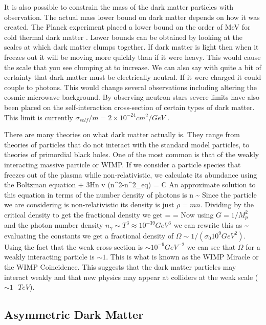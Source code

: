 It is also possible to constrain the mass of the dark matter particles with observation. The actual mass lower bound on dark matter depends on how it was created. 
The Planck experiment placed a lower bound on the order of MeV for cold thermal dark matter \cite{planck}. Lower bounds can be obtained by looking at the scales at
which dark matter clumps together. If dark matter is light then when it freezes out it will be moving more quickly than if it were heavy. This would cause the scale
that you see clumping at to increase. We can also say with quite a bit of certainty that dark matter must be electrically neutral. If it were charged it could couple
 to photons. This would change several observations including altering the cosmic microwave background. By observing neutron stars severe limits have also been placed 
on the self-interaction cross-section of certain types of dark matter. This limit is currently $\sigma_{self} /m = 2 \times 10^{-24} cm^2/GeV$ \cite{selfint}.

There are many theories on what dark matter actually is. They range from theories of particles that do not interact with the standard model particles, to  
 theories of primordial black holes. One of the most common is that of the weakly interacting massive particle or WIMP. If we consider a particle species that 
freezes out of the plasma while non-relativistic, we calculate its abundance using the Boltzman equation
\beq
    + 3Hn \langle \sigma v \rangle (n^2-n^2_{eq}) = C
\eeq
An approximate solution to this equation in terms of the number density of photons is
\beq
    n \sim {}
\eeq
Since the particle we are considering is non-relativistic its density is just $\rho = m n$. Dividing by the critical density to get the fractional density we get
\beq
    \Omega =  = 
\eeq
Now using $G=1/ M_p^2$ and the photon number density $ n_\gamma \sim T^3 \approx 10^{-39} GeV^3$ we can rewrite this as
\beq
   \Omega \sim {} 
\eeq
evaluating the constants we get a fractional density of $\Omega \sim 1/ (\sigma_0 10^9 GeV^2) $. Using the fact that the weak cross-section is 
$\sim 10^{-9} GeV^{-2}$ we can see that $\Omega$ for a weakly interacting particle is $\sim 1$. This is what is known as the WIMP Miracle or the 
WIMP Coincidence. This suggests that the dark matter particles may interact weakly and that new physics may appear at colliders at the weak scale ($\sim 1 \text{ } TeV$).
  
\subsection{Asymmetric Dark Matter}


